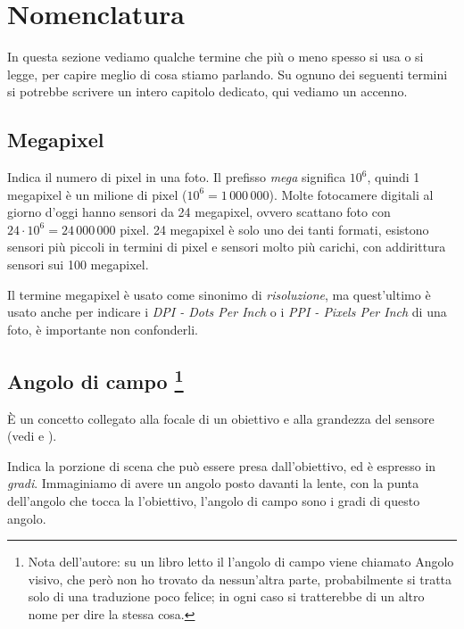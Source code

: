 \section{Nomenclatura} \label{sec:nomenclatura}

In questa sezione vediamo qualche termine che più o meno spesso si usa o si legge, per capire meglio di cosa stiamo parlando. Su ognuno dei seguenti termini si potrebbe scrivere un intero capitolo dedicato, qui vediamo un accenno.

\subsection{Megapixel} \label{subsec:megapixel}
Indica il numero di pixel in una foto. Il prefisso \textit{mega} significa $10^6$, quindi 1 megapixel è un milione di pixel ($10^6 = 1\,000\,000$).
Molte fotocamere digitali al giorno d'oggi hanno sensori da 24 megapixel, ovvero scattano foto con $24 \cdot 10^6 = 24\,000\,000$ pixel. 24 megapixel è solo uno dei tanti formati, esistono sensori più
piccoli in termini di pixel e sensori molto più carichi, con addirittura sensori sui 100 megapixel.

Il termine megapixel è usato come sinonimo di \textit{risoluzione}, ma quest'ultimo è usato anche per indicare i \textit{DPI - Dots Per Inch} o i \textit{PPI - Pixels Per Inch} di una foto, è importante non confonderli.


\subsection[Angolo di campo]{Angolo di campo \footnote{Nota dell'autore: su un libro letto il l'angolo di campo viene chiamato Angolo visivo, che però non ho trovato da nessun'altra parte, probabilmente si tratta solo di una traduzione poco felice; in ogni caso si tratterebbe di un altro nome per dire la stessa cosa.}} \label{subsec:angolocampo}

È un concetto collegato alla focale di un obiettivo e alla grandezza del sensore (vedi  e ).

Indica la porzione di scena che può essere presa dall'obiettivo, ed è espresso in \textit{gradi}. Immaginiamo di avere un angolo posto davanti la lente, con la punta dell'angolo che tocca la l'obiettivo,
l'angolo di campo sono i gradi di questo angolo.

